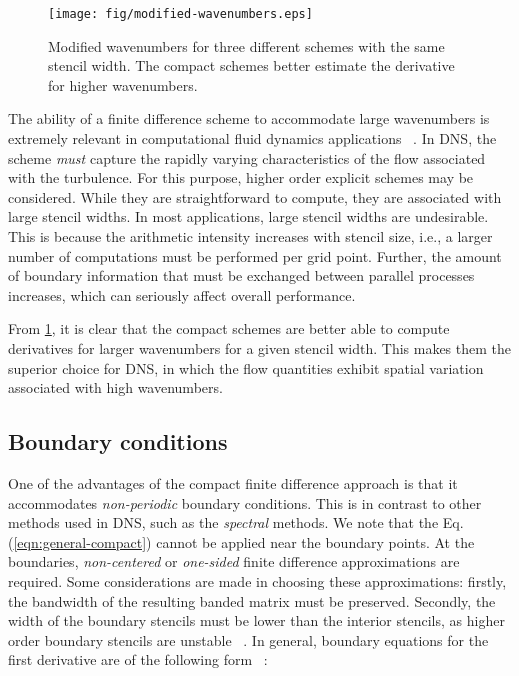 \begin{figure}
\begin{center}
\texttt{[image: fig/modified-wavenumbers.eps]}
\end{center}
\caption{Modified wavenumbers for three different schemes
    with the same stencil width.
    The compact schemes better estimate the derivative
    for higher wavenumbers.}
\label{fig:modified-wavenumbers}
\end{figure}

The ability of a finite difference scheme
to accommodate large wavenumbers
is extremely relevant in
computational fluid dynamics applications
~\cite{KravchenkoEffNumErr}.
In DNS, the scheme
\emph{must} capture the
rapidly varying characteristics of the flow
associated with the turbulence.
For this purpose,
higher order explicit schemes
may be considered.
While they are straightforward to compute,
they are associated with large stencil widths.
In most applications,
large stencil widths are undesirable.
This is because
the arithmetic intensity increases with stencil size, i.e.,
a larger number of computations must be performed per grid point.
Further,
the amount of boundary information that must be exchanged
between parallel processes increases,
which can seriously affect overall performance.

From \ref{fig:modified-wavenumbers},
it is clear that the compact schemes are better
able to compute derivatives for larger wavenumbers
for a given stencil width.
This makes them the superior choice for DNS,
in which the flow quantities
exhibit spatial variation associated with high wavenumbers.

\subsection{Boundary conditions}

One of the advantages of the compact finite difference approach
is that it accommodates \emph{non-periodic} boundary conditions.
This is in contrast to other methods used in DNS,
such as the \emph{spectral} methods.
We note that the Eq. (\ref{eqn:general-compact})
cannot be applied near the boundary points.
At the boundaries,
\emph{non-centered} or \emph{one-sided}
finite difference approximations are required.
Some considerations are made in choosing
these approximations:
firstly, the bandwidth of the resulting banded matrix
must be preserved.
Secondly,
the width of the boundary stencils
must be lower than the interior stencils,
as higher order boundary stencils are unstable
~\cite{kennedy1994several}.
In general, boundary equations for the first derivative
are of the following form ~\cite{lele1992compact}:

